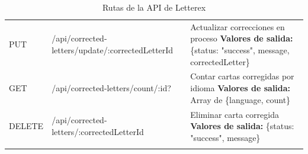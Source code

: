 \begin{longtable}{|l|p{5cm}|p{8cm}|}
PUT & /api/corrected-letters/update/:corrected\-Letter\-Id & Actualizar correcciones en proceso \newline \textbf{Valores de salida:} \{status: "success", message, correctedLetter\} \\
GET & /api/corrected-letters/count/:id? & Contar cartas corregidas por idioma \newline \textbf{Valores de salida:} Array de \{language, count\} \\
DELETE & /api/corrected-letters/:corrected\-Letter\-Id & Eliminar carta corregida \newline \textbf{Valores de salida:} \{status: "success", message\} \\
\hline
\caption{Rutas de la API de Letterex}
\label{tab:rutas-api}
\end{longtable}
